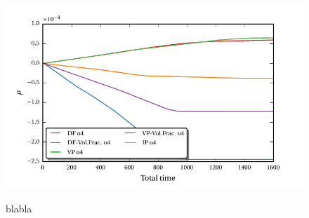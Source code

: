 \newpage

\begin{figure}[!pb]
  \centering
  \includegraphics{gfx/immersed_boundary/hpflow/long/ts.pdf}\label{fig:hpflow_allgc_theo}
  \caption{blabla}
\end{figure}

\clearpage


